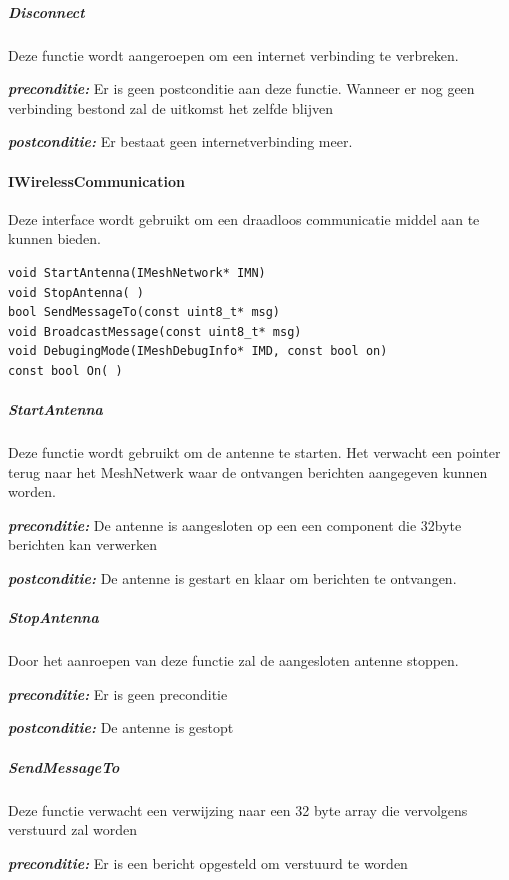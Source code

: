 \documentclass[a4paper, 11pt, oneside]{report}
\begin{document}
\subparagraph{Disconnect} 
\label{DetailedDesign:ros:extern:interfaces:IInternetConnection:Disconnect}
Deze functie wordt aangeroepen om een internet verbinding te verbreken.

\textbf{\textit{preconditie:}} Er is geen postconditie aan deze functie. 
Wanneer er nog geen verbinding bestond zal de uitkomst het zelfde blijven

\textbf{\textit{postconditie:}} Er bestaat geen internetverbinding meer. 

\paragraph{IWirelessCommunication}
\label{DetailedDesign:ros:extern:interfaces:IWirelessCommunication}
Deze interface wordt gebruikt om een draadloos communicatie middel aan te kunnen bieden.

\begin{lstlisting}
void StartAntenna(IMeshNetwork* IMN)
void StopAntenna( )
bool SendMessageTo(const uint8_t* msg)
void BroadcastMessage(const uint8_t* msg)
void DebugingMode(IMeshDebugInfo* IMD, const bool on)
const bool On( )
\end{lstlisting}

\subparagraph{StartAntenna}
\label{DetailedDesign:ros:extern:interfaces:IWirelessCommunication:StartAntenna}
Deze functie wordt gebruikt om de antenne te starten. Het verwacht een pointer terug naar het MeshNetwerk waar de ontvangen berichten aangegeven kunnen worden.

\textbf{\textit{preconditie:}} De antenne is aangesloten op een een component die 32byte berichten kan verwerken

\textbf{\textit{postconditie:}} De antenne is gestart en klaar om berichten te ontvangen.

\subparagraph{StopAntenna}
\label{DetailedDesign:ros:extern:interfaces:IWirelessCommunication:StopAntenna}
Door het aanroepen van deze functie zal de aangesloten antenne stoppen.

\textbf{\textit{preconditie:}} Er is geen preconditie

\textbf{\textit{postconditie:}} De antenne is gestopt

\subparagraph{SendMessageTo}
\label{DetailedDesign:ros:extern:interfaces:IWirelessCommunication:SendMessageTo}
Deze functie verwacht een verwijzing naar een 32 byte array die vervolgens verstuurd zal worden

\textbf{\textit{preconditie:}}  Er is een bericht opgesteld om verstuurd te worden
\end{document}
